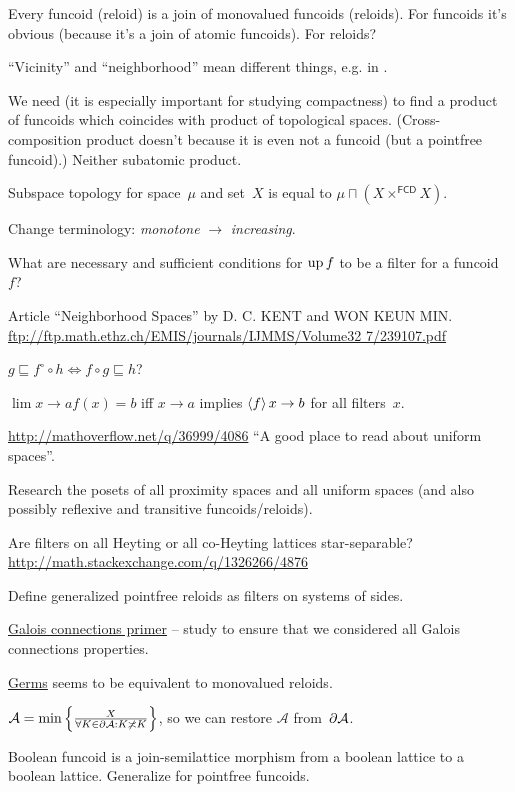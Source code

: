 \documentclass{amsart}
\begin{document}
Every funcoid (reloid) is a join of monovalued funcoids (reloids). For funcoids it's obvious
(because it's a join of atomic funcoids). For reloids?

``Vicinity'' and ``neighborhood'' mean different things, e.g. in \cite{converg}.

We need (it is especially important for studying compactness) to find a product of funcoids which coincides with
product of topological spaces. (Cross-composition product doesn't because it is even not a funcoid (but a pointfree funcoid).)
Neither subatomic product.

Subspace topology for space~$\mu$ and set~$X$ is equal to $\mu\sqcap(X\times^{\mathsf{FCD}} X)$.

Change terminology: \emph{monotone} $\rightarrow$ \emph{increasing}.

What are necessary and sufficient conditions for $\operatorname{up} f$ to be a filter for a funcoid~$f$?

Article ``Neighborhood Spaces'' by D. C. KENT and WON KEUN MIN.
\url{ftp://ftp.math.ethz.ch/EMIS/journals/IJMMS/Volume32 7/239107.pdf}

$g\sqsubseteq f^{\circ}\circ h \Leftrightarrow f\circ g\sqsubseteq h$?

$\lim {x\rightarrow a} f(x) = b$ iff $x\rightarrow a$ implies $\left\langle f\right\rangle x\rightarrow b$ for all filters~$x$.

\url{http://mathoverflow.net/q/36999/4086} ``A good place to read about uniform spaces''.

Research the posets of all proximity spaces and all uniform spaces (and also possibly reflexive and transitive funcoids/reloids).

Are filters on all Heyting or all co-Heyting lattices star-separable?
\url{http://math.stackexchange.com/q/1326266/4876}

Define generalized pointfree reloids as filters on systems of sides.

\href{https://www.math.ksu.edu/~strecker/primer.ps}{Galois connections primer} -- study to ensure that we considered all Galois connections properties.

\href{https://en.wikipedia.org/wiki/Germ (mathematics)}{Germs} seems to be equivalent to monovalued reloids.

$\mathcal{A} = \min\left\{ \frac{X}{\forall K\in\partial\mathcal{A}:K\not\asymp K}\right\}$, so we can restore $\mathcal{A}$ from~$\partial\mathcal{A}$.

Boolean funcoid is a join-semilattice morphism from a boolean lattice to a boolean lattice. Generalize for pointfree funcoids.
\end{document}
